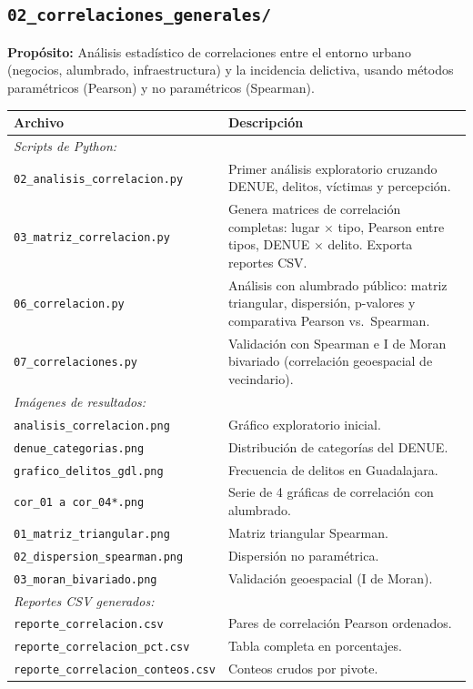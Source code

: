 \documentclass[12pt, a4paper]{article}
\begin{document}
\subsection{\texttt{02\_correlaciones\_generales/}}

\textbf{Propósito:} Análisis estadístico de correlaciones entre el entorno urbano (negocios, alumbrado, infraestructura) y la incidencia delictiva, usando métodos paramétricos (Pearson) y no paramétricos (Spearman).

\begin{table}[h!]
\centering
\small
\begin{tabular}{p{5.5cm} p{8.5cm}}
\toprule
\textbf{Archivo} & \textbf{Descripción} \\
\midrule
\multicolumn{2}{l}{\textit{Scripts de Python:}} \\
\addlinespace
\texttt{02\_analisis\_correlacion.py} & Primer análisis exploratorio cruzando DENUE, delitos, víctimas y percepción. \\
\texttt{03\_matriz\_correlacion.py} & Genera matrices de correlación completas: lugar $\times$ tipo, Pearson entre tipos, DENUE $\times$ delito. Exporta reportes CSV. \\
\texttt{06\_correlacion.py} & Análisis con alumbrado público: matriz triangular, dispersión, p-valores y comparativa Pearson vs.\ Spearman. \\
\texttt{07\_correlaciones.py} & Validación con Spearman e I de Moran bivariado (correlación geoespacial de vecindario). \\
\midrule
\multicolumn{2}{l}{\textit{Imágenes de resultados:}} \\
\addlinespace
\texttt{analisis\_correlacion.png} & Gráfico exploratorio inicial. \\
\texttt{denue\_categorias.png} & Distribución de categorías del DENUE. \\
\texttt{grafico\_delitos\_gdl.png} & Frecuencia de delitos en Guadalajara. \\
\texttt{cor\_01 a cor\_04*.png} & Serie de 4 gráficas de correlación con alumbrado. \\
\texttt{01\_matriz\_triangular.png} & Matriz triangular Spearman. \\
\texttt{02\_dispersion\_spearman.png} & Dispersión no paramétrica. \\
\texttt{03\_moran\_bivariado.png} & Validación geoespacial (I de Moran). \\
\midrule
\multicolumn{2}{l}{\textit{Reportes CSV generados:}} \\
\addlinespace
\texttt{reporte\_correlacion.csv} & Pares de correlación Pearson ordenados. \\
\texttt{reporte\_correlacion\_pct.csv} & Tabla completa en porcentajes. \\
\texttt{reporte\_correlacion\_conteos.csv} & Conteos crudos por pivote. \\
\bottomrule
\end{tabular}
\end{table}
\end{document}
